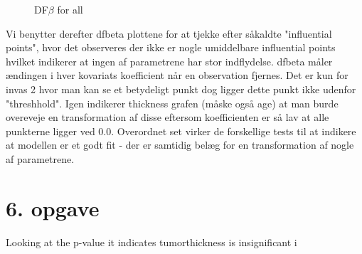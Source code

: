\begin{figure}[h]
    \hfill
    \hfill
    \caption{DF$\beta$ for all}
\end{figure}




\noindent Vi benytter derefter dfbeta plottene for at tjekke efter såkaldte "influential points", hvor det observeres der ikke er nogle umiddelbare influential points hvilket indikerer at ingen af parametrene har stor indflydelse. dfbeta måler ændingen i hver kovariats koefficient når en observation fjernes. Det er kun for invas 2 hvor man kan se et betydeligt punkt dog ligger dette punkt ikke udenfor "threshhold". Igen indikerer thickness grafen (måske også age) at man burde overeveje en transformation af disse eftersom koefficienten er så lav at alle punkterne ligger ved 0.0.
\pause
Overordnet set virker de forskellige tests til at indikere at modellen er et godt fit - der er samtidig belæg for en transformation af nogle af parametrene.

\chapter{6. opgave}
Looking at the p-value it indicates tumorthickness is insignificant i


